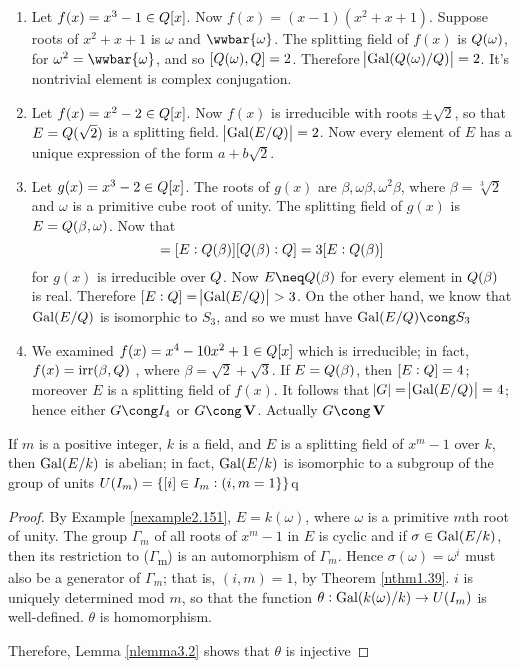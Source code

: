 \documentclass[11pt]{article}
\begin{document}
\begin{examplle}[]
\begin{enumerate}
\item Let \(f(x)=x^3-1\in\relax{Q}[x]\). Now \(f(x)=(x-1)(x^2+x+1)\). Suppose roots of
\(x^2+x+1\) is \(\omega\) and \(\wwbar{\omega}\). The splitting field of
\(f(x)\) is \(\relax{Q}(\omega)\), for \(\omega^2=\wwbar{\omega}\), and so \([\relax{Q}(\omega),\relax{Q}]=2\).
Therefore \(\abs{\operatorname{Gal}(\relax{Q}(\omega)/\relax{Q})}=2\). It's nontrivial element is complex conjugation.
\item Let \(f(x)=x^2-2\in\relax{Q}[x]\). Now \(f(x)\) is irreducible with roots
\(\pm\sqrt{2}\), so that \(E=\relax{Q}(\sqrt{2})\) is a splitting field.
\(\abs{\operatorname{Gal}(E/\relax{Q})}=2\). Now every element of \(E\) has a unique expression
of the form \(a+b\sqrt{2}\).
\item Let \(g(x)=x^3-2\in\relax{Q}[x]\). The roots of \(g(x)\) are
\(\beta,\omega\beta,\omega^2\beta\), where \(\beta=\sqrt[3]{2}\) and \(\omega\) is a
primitive cube root of unity. The splitting field of \(g(x)\) is
\(E=\relax{Q}(\beta,\omega)\). Now that 
\begin{equation*}
[E:\Q]=[E:\Q(\beta)][\Q(\beta):\Q]=3[E:\Q(\beta)]
\end{equation*}
for \(g(x)\) is irreducible over \(\relax{Q}\). Now \(E\neq\Q(\beta)\) for every
element in \(\relax{Q}(\beta)\) is real. Therefore \([E:\relax{Q}]=\abs{\operatorname{Gal}(E/\relax{Q})}>3\). On the
other hand, we know that \(\operatorname{Gal}(E/\relax{Q})\) is isomorphic to \(S_3\), and so
we must have \(\Gal(E/\Q)\cong S_3\)
\item We examined \(f(x)=x^4-10x^2+1\in\relax{Q}[x]\) which is irreducible; in fact,
\(f(x)=\operatorname{irr}(\beta,\relax{Q})\) , where \(\beta=\sqrt{2}+\sqrt{3}\). If \(E=\relax{Q}(\beta)\),
then \([E:\relax{Q}]=4\); moreover \(E\) is a splitting field of \(f(x)\). It follows
that \(\abs{G}=\abs{\operatorname{Gal}(E/\relax{Q})}=4\); hence either \(G\cong\I_4\) or
\(G\cong\bV\). Actually \(G\cong\bV\)
\end{enumerate}
\end{examplle}

\begin{proposition}[]
If \(m\) is a positive integer, \(k\) is a field, and \(E\) is a splitting field of
\(x^m-1\) over \(k\), then \(\operatorname{Gal}(E/k)\) is abelian; in fact, \(\operatorname{Gal}(E/k)\) is
isomorphic to a subgroup of the group of units \(U(\relax{I}_m)=\{[i]\in\relax{I}_m:(i,m=1\}\}\)q
\end{proposition}

\begin{proof}
By Example \ref{nexample2.151}, \(E=k(\omega)\), where \(\omega\) is a primitive \(m\)th root
of unity. The group \(\Gamma_m\) of all roots of \(x^m-1\) in \(E\) is cyclic
and if \(\sigma\in\operatorname{Gal}(E/k)\), then its restriction to (\(\Gamma\)\textsubscript{m}) is an
automorphism of \(\Gamma_m\). Hence \(\sigma(\omega)=\omega^i\) must also be a
generator of \(\Gamma_m\); that is, \((i,m)=1\), by Theorem \ref{nthm1.39}. \(i\)
is uniquely determined mod \(m\), so that the function 
\(\theta:\operatorname{Gal}(k(\omega)/k)\to U(\relax{I}_m)\) is well-defined. \(\theta\) is homomorphism.

Therefore, Lemma \ref{nlemma3.2} shows that \(\theta\) is injective
\end{proof}
\end{document}
